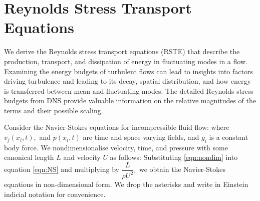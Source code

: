 \chapter{Reynolds Stress Transport Equations}
\label{chap:rste}
We derive the Reynolds stress transport equations (RSTE) that describe the production, transport, and dissipation of energy in fluctuating modes in a flow. Examining the energy budgets of turbulent flows can lead to insights into factors driving turbulence and leading to its decay, spatial distribution, and how energy is transferred between mean and fluctuating modes. The detailed Reynolds stress budgets from DNS provide valuable information on the relative magnitudes of the terms and their possible scaling.

Consider the Navier-Stokes equations for incompressible fluid flow:
where $v_j(x_i,t),$ and $p(x_i,t)$ are time and space varying fields, and $g_i$ is a constant body force. We nondimensionalise velocity, time, and pressure with some canonical length $L$ and velocity $U$ as follows:
Substituting \autoref{eqn:nondim} into equation \autoref{eqn:NS} and multiplying by $\dfrac{L}{\rho U^2},$ we obtain the Navier-Stokes equations in non-dimensional form.
We drop the asterisks and write in Einstein indicial notation for convenience.
